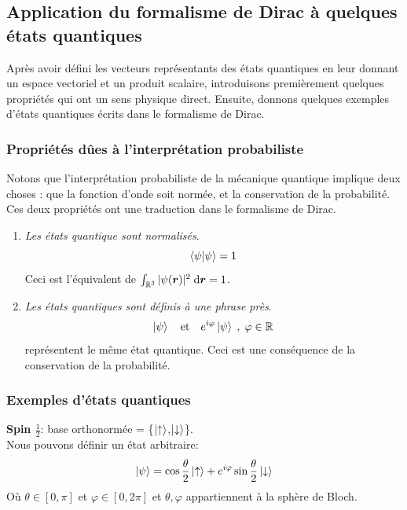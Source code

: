 \documentclass[../notesdecours.tex]{subfiles}
\begin{document}
\subsection{Application du formalisme de Dirac à quelques états quantiques}
Après avoir défini les vecteurs représentants des états quantiques en leur donnant un espace vectoriel et un produit scalaire, introduisons premièrement quelques propriétés qui ont un sens physique direct. Ensuite, donnons quelques exemples d'états quantiques écrits dans le formalisme de Dirac.

\subsubsection{Propriétés dûes à l'interprétation probabiliste}
Notons que l'interprétation probabiliste de la mécanique quantique implique deux choses : que la fonction d'onde soit normée, et la conservation de la probabilité. Ces deux propriétés ont une traduction dans le formalisme de Dirac.

\begin{enumerate}
\item \emph{Les états quantique sont normalisés}.
\begin{equation}
\braket{\psi|\psi} = 1
\end{equation}
Ceci est l'équivalent de $\int_{\mathbb{R}^3} |\psi(\bm{r})| ^2 \; \mathrm{d} \bm{r} = 1$.
\item \emph{Les états quantiques sont définis à une phrase près}.
\begin{equation}
\ket{\psi} 	\quad \text{et} \quad  e^{i\varphi}\ket{\psi} \; , \; \varphi \in \mathbb{R}
\end{equation}
représentent le même état quantique. Ceci est une conséquence de la conservation de la probabilité.
\end{enumerate}


\subsubsection{Exemples d'états quantiques}
\textbf{Spin $\frac{1}{2}$}: base orthonormée = \bigg\{$\ket{\uparrow}$,$\ket{\downarrow}$\bigg\}.\\

Nous pouvons définir un état arbitraire:
\begin{equation}
\ket{\psi} = \cos\frac{\theta}{2} \ket{\uparrow}+e^{i\varphi}\sin\frac{\theta}{2}\ket{\downarrow}
\end{equation}
Où $\theta\in[0,\pi]$ et $\varphi \in [0,2\pi]$ et $\theta,\varphi$ appartiennent à la sphère de Bloch.\\
\end{document}
